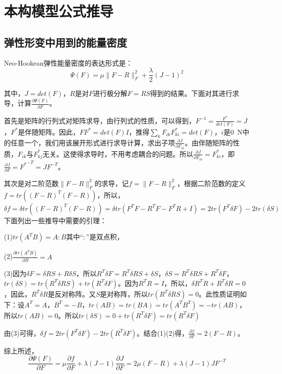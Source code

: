 \documentclass[UTF8]{article}
\begin{document}
\section{{本构模型公式推导}}
\subsection{{弹性形变中用到的能量密度}}
{\songti Neo-Hookean弹性能量密度的表达形式是：\begin{equation}\Psi(F)=\mu \|F-R\|^2_F+\frac{\lambda}{2}(J-1)^2\end{equation}

其中，$J=det(F)$，$R$是对$F$进行极分解$F=RS$得到的结果。下面对其进行求导，计算$\frac{\partial \Psi(F)}{\partial F}$。

首先是矩阵的行列式对矩阵求导，由行列式的性质，可以得到，$F^{-1}=\frac{F^*}{det(F)}=J$，$F^*$是伴随矩阵。因此，$FF^*=det(F)I$，推得$\sum_{k}F_{ik}F^*_{ki}=det(F)$，$i$是0~N中的任意一个，我们用该展开形式进行求导计算，求出子项$\frac{\partial J}{\partial F_{ik}}$。由伴随矩阵的性质，$F_{ik}$与$F^*_{kj}$无关。这使得求导时，不用考虑耦合的问题。所以$\frac{\partial J}{\partial F_{ik}}=F^*_{ki}$，即$\frac{\partial J}{\partial F}={F^*}^{-T}=JF^{-T}$。

其次是对二阶范数$\|F-R\|^2_F$的求导，记$f=\|F-R\|^2_F$，根据二阶范数的定义$f=tr((F-R)^T(F-R))$，所以，\begin{equation}\delta f=\delta tr((F-R)^T(F-R))=\delta tr(F^TF-R^TF-F^TR+I)=2tr(F^T\delta F)-2tr(\delta S)\end{equation}下面列出一些推导中需要的引理：

(1)$tr(A^TB)=A:B$其中“$:$”是双点积，

(2)$\frac{\partial tr(A^TB)}{\partial B}=A$

(3)因为$\delta F=\delta RS+R\delta S$，所以$R^T\delta F=R^T\delta RS+\delta S$，$\delta S=R^T\delta RS+R^T\delta F$，$tr(\delta S)=tr(R^T\delta RS)+tr(R^T\delta F)$。因为$R^TR=I$，所以，$\delta R^TR+R^T\delta R=0$，因此，$R^T\delta R$是反对称阵。又$S$是对称阵，所以$tr(R^T\delta RS)=0$。此性质证明如下：设$A^T=A$，$B^T=-B$，$tr(AB)=tr(BA)=tr(A^TB^T)=-tr(AB)$，所以$tr(AB)=0$。所以$tr(\delta S)=0+tr(R^T\delta F)=tr(R^T\delta F)$

由(3)可得，$\delta f=2tr(F^T\delta F)-2tr(R^T\delta F)$。结合(1)(2)得，$\frac{\partial f}{\partial F}=2(F-R)$。

综上所述，\begin{equation}\frac{\partial \Psi(F)}{\partial F}=\mu \frac{\partial f}{\partial F}+\lambda(J-1)\frac{\partial J}{\partial F}=2\mu (F-R)+\lambda(J-1)JF^{-T}\end{equation}
}
\end{document}
